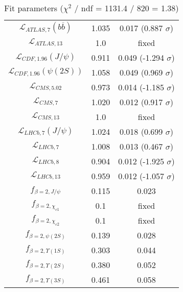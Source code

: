 \begin{table}[h!]
\begin{tabular}{c|c|c}
$\mathcal L_{ATLAS,7}(b\overline b)$ & 1.035 & 0.017 (0.887 $\sigma$) \\
$\mathcal L_{ATLAS,13}$ & 1.0 & fixed \\
$\mathcal L_{CDF,1.96}(J/\psi)$ & 0.911 & 0.049 (-1.294 $\sigma$) \\
$\mathcal L_{CDF,1.96}(\psi(2S))$ & 1.058 & 0.049 (0.969 $\sigma$) \\
$\mathcal L_{CMS,5.02}$ & 0.973 & 0.014 (-1.185 $\sigma$) \\
$\mathcal L_{CMS,7}$ & 1.020 & 0.012 (0.917 $\sigma$) \\
$\mathcal L_{CMS,13}$ & 1.0 & fixed \\
$\mathcal L_{LHCb,7}(J/\psi)$ & 1.024 & 0.018 (0.699 $\sigma$) \\
$\mathcal L_{LHCb,7}$ & 1.008 & 0.013 (0.467 $\sigma$) \\
$\mathcal L_{LHCb,8}$ & 0.904 & 0.012 (-1.925 $\sigma$) \\
$\mathcal L_{LHCb,13}$ & 0.959 & 0.012 (-1.057 $\sigma$) \\
$f_{\beta=2,J/\psi}$ & 0.115 & 0.023 \\
$f_{\beta=2,\chi_{c1}}$ & 0.1 & fixed \\
$f_{\beta=2,\chi_{c2}}$ & 0.1 & fixed \\
$f_{\beta=2,\psi(2S)}$ & 0.139 & 0.028 \\
$f_{\beta=2,\Upsilon(1S)}$ & 0.303 & 0.044 \\
$f_{\beta=2,\Upsilon(2S)}$ & 0.380 & 0.052 \\
$f_{\beta=2,\Upsilon(3S)}$ & 0.461 & 0.058 \\
\end{tabular}
\caption{Fit parameters ($\chi^2$ / ndf = 1131.4 / 820 = 1.38)}
\end{table}
